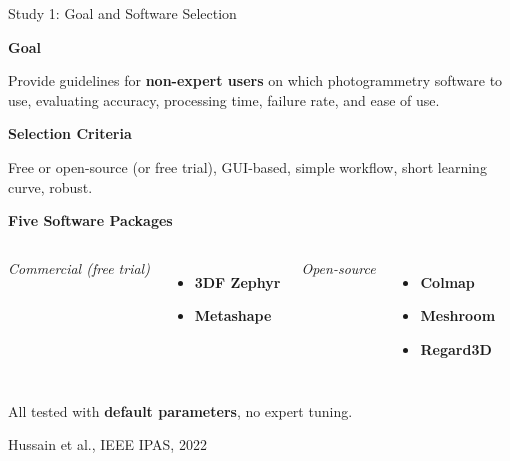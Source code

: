 \documentclass[aspectratio=169, 12pt]{beamer}
\newcommand{\citefooter}[1]{\hfill{\tiny #1}}
\begin{document}
\begin{frame}{Study 1: Goal and Software Selection}
	
	
	\textbf{\textcolor{gbAqua}{Goal}}
	
	Provide guidelines for \textbf{non-expert users} on which photogrammetry software to use, evaluating accuracy, processing time, failure rate, and ease of use.
	
	\vspace{0.25cm}
	
	\textbf{\textcolor{gbAqua}{Selection Criteria}}
	
	Free or open-source (or free trial), GUI-based, simple workflow, short learning curve, robust.
	
	\vspace{0.25cm}
	
	\textbf{\textcolor{gbAqua}{Five Software Packages}}
	
	\begin{columns}[t]
		\textit{Commercial (free trial)}
		\begin{itemize}
			\item \textbf{3DF Zephyr} 
			\item \textbf{Metashape} 
		\end{itemize}
		
		\textit{Open-source}
		\begin{itemize}
			\item \textbf{Colmap} 
			\item \textbf{Meshroom} 
			\item \textbf{Regard3D} 
		\end{itemize}
	\end{columns}
	
	\vspace{0.2cm}
	All tested with \textbf{default parameters}, no expert tuning.
	
	\citefooter{Hussain et al., IEEE IPAS, 2022}
\end{frame}
\end{document}
